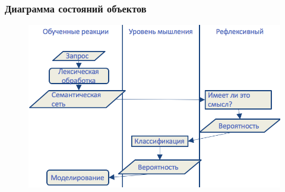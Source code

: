 \documentclass[14pt]{beamer}
\begin{document}
\begin{frame}
\frametitle{Диаграмма состояний объектов}
\begin{figure} [h] 
  \center
  \includegraphics [scale=0.35] {ObjectState}
  \label{img:ObjectState}  
\end{figure}
\end{frame}
\end{document}
